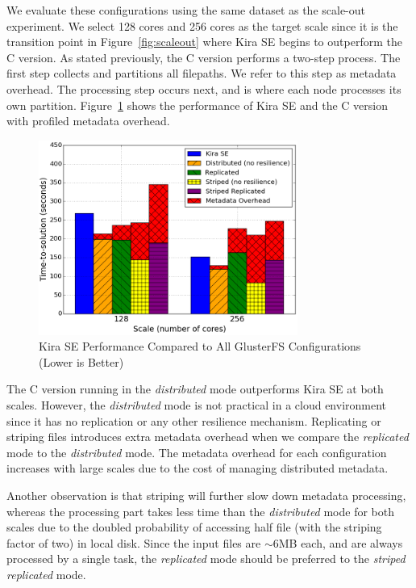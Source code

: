 \documentclass[conference]{IEEEtran}
\newcommand{\up}{\vspace*{-1em}}
\begin{document}
We evaluate these configurations using the same dataset as the scale-out experiment. We
select 128 cores and 256 cores as the target scale since it is the transition point in
Figure~\ref{fig:scaleout} where Kira SE begins to outperform the C version. As stated
previously, the C version performs a two-step process. The first step collects and
partitions all filepaths. We refer to this step as metadata overhead. The processing
step occurs next, and is where each node processes its own partition.
Figure~\ref{fig:allgluster} shows the performance of Kira SE and the C version with
profiled metadata overhead.  

\begin{figure}[h]
	\begin{center}
		\includegraphics[width=85mm]{pictures/allgluster}
		\caption{Kira SE Performance Compared to All GlusterFS Configurations (Lower is Better)
		\label{fig:allgluster}}
		\up\up
  	\end{center}
\end{figure}

The C version running in the \emph{distributed} mode outperforms Kira SE at both scales. 
However, the \emph{distributed} mode is not practical in a cloud environment since
it has no replication or any other resilience mechanism. Replicating or striping
files introduces extra metadata overhead when we compare the \emph{replicated} mode
to the \emph{distributed} mode. The metadata overhead for each configuration increases
with large scales due to the cost of managing distributed metadata.

Another observation is that striping will further slow down metadata processing, whereas the
processing part takes less time than the \emph{distributed} mode for both scales due
to the doubled probability of accessing half file (with the striping factor of two) in local disk.
Since the input files are $\sim$6MB each, and are always processed by a single task, the
\emph{replicated} mode should be preferred to the \emph{striped replicated} mode.
\end{document}
